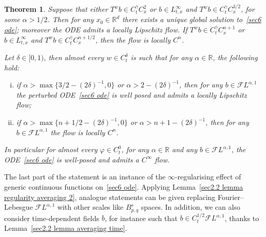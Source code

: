\documentclass[10pt]{article}
\newenvironment{enumerateroman}{\begin{enumerate}[i.] }{\end{enumerate}}
\newtheorem{theorem}{Theorem}
\begin{document}
\begin{theorem}
  \label{sec6 thm ode}Suppose that either $T^w b \in C^{\gamma}_t C^2_x$ or $b
  \in L^{\infty}_{t, x}$ and $T^w b \in C^{\gamma}_t C^{3 / 2}_x$, for some
  $\alpha > 1 / 2$. Then for any $x_0 \in \mathbb{R}^d$ there exists a unique
  global solution to~{\eqref{sec6 ode}}; moreover the ODE admits a locally
  Lipschitz flow. If $T^w b \in C^{\gamma}_t C^{n + 1}_x$ or $b \in
  L^{\infty}_{t, x}$ and $T^w b \in C^{\gamma}_t C^{n + 1 / 2}_x$, then the
  flow is locally $C^n$.
  
  Let $\delta \in [0, 1)$, then almost every $w \in C^{\delta}_t$ is such that
  for any $\alpha \in \mathbb{R}$, the following hold:
  \begin{enumerateroman}
    \item if $\alpha > \max \{ 3 / 2 - (2 \delta)^{- 1}, 0 \}$ or $\alpha > 2
    - (2 \delta)^{- 1}$, then for any $b \in \mathcal{F} L^{\alpha, 1}$ the
    perturbed ODE~{\eqref{sec6 ode}} is well posed and admits a locally
    Lipschitz flow;
    
    \item if $\alpha > \max \{ n + 1 / 2 - (2 \delta)^{- 1}, 0 \}$ or $\alpha
    > n + 1 - (2 \delta)^{- 1}$, then for any $b \in \mathcal{F} L^{\alpha,
    1}$ the flow is locally $C^n$.
  \end{enumerateroman}
  In particular for almost every $\varphi \in C^0_t$, for any $\alpha \in
  \mathbb{R}$ and any $b \in \mathcal{F} L^{\alpha, 1}$, the ODE~{\eqref{sec6
  ode}} is well\mbox{-}posed and admits a $C^{\infty}$ flow.
\end{theorem}

The last part of the statement is an instance of the
$\infty$\mbox{-}regularising effect of generic continuous functions
on~{\eqref{sec6 ode}}. Applying Lemma~\ref{sec2.2 lemma regularity averaging
2}, analogue statements can be given replacing Fourier--Lebesgue $\mathcal{F}
L^{\alpha, 1}$ with other scales like $B^s_{p, q}$ spaces. In addition, we can
also consider time\mbox{-}dependent fields $b$, for instance such that $b \in
C^{1 / 2}_t \mathcal{F} L^{\alpha, 1}$, thanks to Lemma~\ref{sec2.2 lemma
averaging time}.

\
\end{document}
